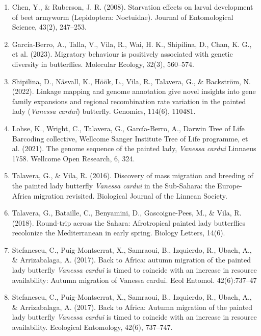 \documentclass[lineno]{wiley-article}
\begin{document}
\begin{enumerate}
\item Chen, Y., \& Ruberson, J. R. (2008). Starvation effects on larval development of beet armyworm (Lepidoptera: Noctuidae). Journal of Entomological Science, 43(2), 247–253.

\item García-Berro, A., Talla, V., Vila, R., Wai, H. K., Shipilina, D., Chan, K. G., et al. (2023). Migratory behaviour is positively associated with genetic diversity in butterflies. Molecular Ecology, 32(3), 560–574.

\item Shipilina, D., Näsvall, K., Höök, L., Vila, R., Talavera, G., \& Backström, N. (2022). Linkage mapping and genome annotation give novel insights into gene family expansions and regional recombination rate variation in the painted lady (\textit{Vanessa cardui}) butterfly. Genomics, 114(6), 110481.

\item Lohse, K., Wright, C., Talavera, G., García-Berro, A., Darwin Tree of Life Barcoding collective, Wellcome Sanger Institute Tree of Life programme, et al. (2021). The genome sequence of the painted lady, \textit{Vanessa cardui} Linnaeus 1758. Wellcome Open Research, 6, 324.

\item Talavera, G., \& Vila, R. (2016). Discovery of mass migration and breeding of the painted lady butterfly \textit{Vanessa cardui} in the Sub-Sahara: the Europe-Africa migration revisited. Biological Journal of the Linnean Society. 

\item Talavera, G., Bataille, C., Benyamini, D., Gascoigne-Pees, M., \& Vila, R. (2018). Round-trip across the Sahara: Afrotropical painted lady butterflies recolonize the Mediterranean in early spring. Biology Letters, 14(6).

\item Stefanescu, C., Puig-Montserrat, X., Samraoui, B., Izquierdo, R., Ubach, A., \& Arrizabalaga, A. (2017). Back to Africa: autumn migration of the painted lady butterfly \textit{Vanessa cardui} is timed to coincide with an increase in resource availability: Autumn migration of Vanessa cardui. Ecol Entomol. 42(6):737–47

\item Stefanescu, C., Puig-Montserrat, X., Samraoui, B., Izquierdo, R., Ubach, A., \& Arrizabalaga, A. (2017). Back to Africa: Autumn migration of the painted lady butterfly \textit{Vanessa cardui} is timed to coincide with an increase in resource availability. Ecological Entomology, 42(6), 737–747.


\end{enumerate}
\end{document}
